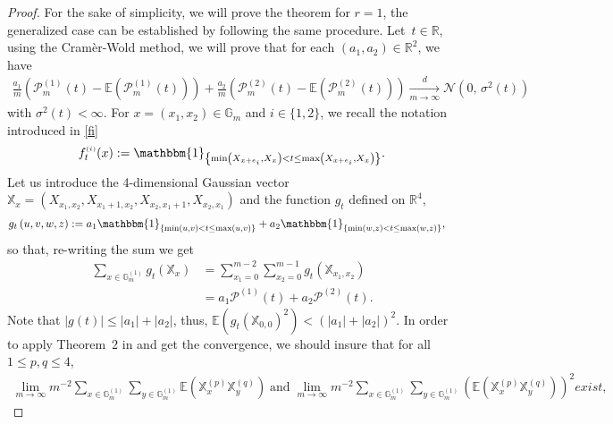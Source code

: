 \documentclass[12pt]{article}
\theoremstyle{Theorem}
\theoremstyle{definition}
\begin{document}
\begin{proof} For the sake of simplicity, we will prove the theorem for $r=1$, the generalized case can be established by following the same procedure. Let~$ t \in \mathbb{R}$, using the Cramèr-Wold method, we will prove that for each $(a_1, a_2) \in \mathbb{R}^{2}$, we have 
\begin{align*}
\frac{a_{1}}{m}\left(\mathcal{P}^{\scriptscriptstyle (1)}_{m}(t) - \mathbb{E}\left(\mathcal{P}^{\scriptscriptstyle (1)}_{m}(t)\right)\right) + \frac{a_{2}}{m}\left(\mathcal{P}^{\scriptscriptstyle (2)}_{m}(t) - \mathbb{E}\left(\mathcal{P}^{\scriptscriptstyle (2)}_{m}(t)\right)\right) \xrightarrow[m \to \infty]{d} \mathcal{N}\left(0,\,\sigma^{2}(t)\right) 
\end{align*}
with $\sigma^{2}(t) < \infty$. For $x=(x_{1}, x_{2}) \in \mathbb{G}_{m}$ and $i \in \{1,2\}$, we recall the notation introduced in \eqref{fi}
\begin{align*}
f_{t}^{\scriptscriptstyle (i)}(x) := \mathbbm{1}_{\left\{\min\left(X_{x+e_{i}}, X_{\scriptscriptstyle x}\right) < t \leq \max\left(X_{x+e_{i}}, X_{\scriptscriptstyle x}\right)\right\}}.
\end{align*}
Let us introduce the 4-dimensional Gaussian vector $\mathbb{X}_{x} = (X_{x_1, x_2}, X_{x_1 + 1, x_2}, X_{x_2, x_1+1}, X_{x_2, x_1} )$ and the function $g_{t}$ defined on  $\mathbb{R}^{4}$, 
\begin{align*}
g_{t}\left(u,v, w, z\right) & := a_{1}\mathbbm{1}_{\left\{\min\left(u, v\right) < t \leq \max\left(u, v\right)\right\}} + a_{2}\mathbbm{1}_{\left\{\min\left(w, z\right) < t \leq \max\left(w, z\right)\right\}},
\end{align*}
so that, re-writing the sum we get
\begin{align*} 
\sum_{x \in \mathbb{G}^{(1)}_{m}} g_{t}\left(\mathbb{X}_{x}\right)  & = \sum_{x_1 = 0}^{m-2}\sum_{x_2 = 0}^{m-1} g_{t}\left(\mathbb{X}_{x_{1}, x_{2}}\right)  \\
&=  a_{1}\mathcal{P}^{\scriptscriptstyle (1)}(t) + a_{2}\mathcal{P}^{\scriptscriptstyle (2)}(t).
\end{align*}
Note that $\left|g(t)\right| \leq \left|a_{1}\right| + \left|a_{2}\right|$, thus, $\mathbb{E}\left(g_{t}\left(\mathbb{X}_{\scriptscriptstyle  0, 0}\right)^{2}\right) < (|a_{1}| + |a_{2}|)^{2}$. In order to apply Theorem~$2$ in \cite{arcones} and get the convergence, we should insure that for all $1 \leq p,q \leq 4$, 
\begin{align*}
\lim_{m \to \infty} m^{-2} \sum_{x \in \mathbb{G}^{\scriptscriptstyle (1)}_{m}}\sum_{y \in \mathbb{G}^{\scriptscriptstyle (1)}_{m}} \mathbb{E}\left(\mathbb{X}^{(p)}_{x}\mathbb{X}^{(q)}_{y}\right) \; \text{and} \; \lim_{m \to \infty} m^{-2} \sum_{x \in \mathbb{G}^{\scriptscriptstyle (1)}_{m}}\sum_{y \in \mathbb{G}^{\scriptscriptstyle (1)}_{m}} \left(\mathbb{E}\left(\mathbb{X}^{(p)}_{x}\mathbb{X}^{(q)}_{y}\right)\right)^{2} exist,

\end{align*}
\end{proof}
\end{document}
